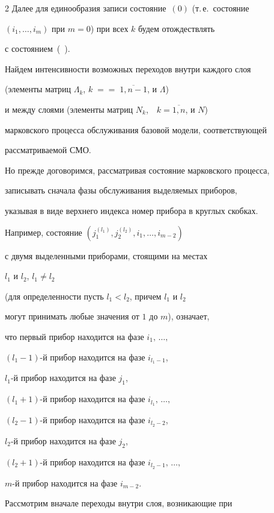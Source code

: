 \begin{multicols}{2}
Далее для единообразия записи состояние~$(0)$ (т.\,е.\ состояние


$(i_1,\ldots,i_m)$ при $m=0$) при всех $k$ будем отождествлять


с состоянием~(\ ).





Найдем интенсивности возможных переходов внутри каждого слоя


(элементы мат\-риц $\Lambda_k$, $k\;=$\linebreak $=\;\overline{1,n-1}$, и $\Lambda$)


и между слоями (элементы мат\-риц $N_k$,\ \ $k=\overline{1,n}$, и $N$)


марковского процесса обслуживания базовой модели, соответствующей


рас\-смат\-ри\-ва\-емой СМО.


Но прежде договоримся, рас\-смат\-ри\-вая состояние марковского процесса,


записывать сначала фазы обслуживания выделяемых приборов,


указывая в виде верхнего индекса номер прибора в круглых скобках.


Например, состояние $\left (j_1^{(l_1)},j_2^{(l_2)},i_1,\ldots,i_{m-2}\right )$


с двумя выделенными приборами, стоящими на местах


$l_1$ и $l_2$, $l_1\ne l_2$


(для определенности пусть $l_1 < l_2$, причем $l_1$ и $l_2$


могут принимать любые значения от $1$ до $m$), означает,


что первый прибор находится на фазе $i_1,\,\ldots,$


$(l_1\!-\!1)$-й прибор находится на фазе $i_{l_1-1}$,


$l_1$-й прибор находится на фазе $j_1$,


$(l_1+1)$-й прибор находится на фазе $i_{l_1},\,\ldots,$


$(l_2-1)$-й прибор находится на фазе $i_{l_2-2}$,


$l_2$-й прибор находится на фазе $j_2$,


$(l_2+1)$-й прибор находится на фазе $i_{l_2-1},\,\ldots,$


$m$-й прибор находится на фазе $i_{m-2}$.





Рассмотрим вначале переходы внутри слоя, возникающие при



\end{multicols}
